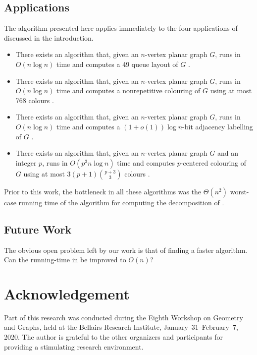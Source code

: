 \documentclass[kpfonts]{patmorin}
\begin{document}
\subsection{Applications}

The algorithm presented here applies immediately to the four applications of  discussed in the introduction.

\begin{itemize}
  \item There exists an algorithm that, given an $n$-vertex planar graph $G$, runs in $O(n\log n)$ time and computes a 49 queue layout of $G$ \cite{dujmovic.joret.ea:planar}.

  \item There exists an algorithm that, given an $n$-vertex planar graph $G$, runs in $O(n\log n)$ time and computes a nonrepetitive colouring of $G$ using at most 768 colours \cite{dujmovic.esperet.ea:planar}.

  \item There exists an algorithm that, given an $n$-vertex planar graph $G$, runs in $O(n\log n)$ time and computes a $(1+o(1))\log n$-bit adjacency labelling of $G$ \cite{dujmovic.esperet.ea:adjacency}.

  \item There exists an algorithm that, given an $n$-vertex planar graph $G$ and an integer $p$, runs in $O(p^3n\log n)$ time and computes $p$-centered colouring of $G$ using at most $3(p+1)\binom{p+3}{3}$ colours \cite{debski.felsner.ea:improved}.
\end{itemize}

Prior to this work, the bottleneck in all these algorithms was the $\Theta(n^2)$ worst-case running time of the algorithm for computing the decomposition of .

\subsection{Future Work}

The obvious open problem left by our work is that of finding a faster algorithm.  Can the running-time in  be improved to $O(n)$?


\section*{Acknowledgement}

Part of this research was conducted during the Eighth Workshop on Geometry and Graphs, held at the Bellairs Research Institute, January~31--February~7, 2020.  The author is grateful to the other organizers and participants for providing a stimulating research environment.




\end{document}
